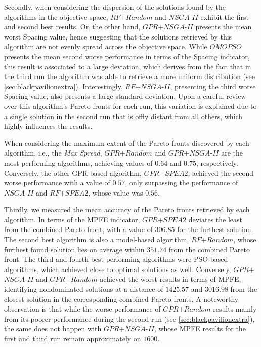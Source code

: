 Secondly, when considering the dispersion of the solutions found by the algorithms in the objective space, $RF$+$Random$ and $NSGA$-$II$ exhibit the first and second best results. On the other hand, $GPR$+$NSGA$-$II$ presents the mean worst Spacing value, hence suggesting that the solutions retrieved by this algorithm are not evenly spread across the objective space. While $OMOPSO$ presents the mean second worse performance in terms of the Spacing indicator, this result is associated to a large deviation, which derives from the fact that in the third run the algorithm was able to retrieve a more uniform distribution (see \cref{sec:blackpavilionextra}). Interestingly, $RF$+$NSGA$-$II$, presenting the third worse Spacing value, also presents a large standard deviation. Upon a careful review over this algorithm's Pareto fronts for each run, this variation is explained due to a single solution in the second run that is offly distant from all others, which highly influences the results. 

When considering the maximum extent of the Pareto fronts discovered by each algorithm, i.e., the \textit{Max Spread}, $GPR$+$Random$ and $GPR$+$NSGA$-$II$ are the most performing algorithms, achieving values of $0.64$ and $0.75$, respectively. Conversely, the other \ac{GPR}-based algorithm, $GPR$+$SPEA2$, achieved the second worse performance with a value of $0.57$, only surpassing the performance of $NSGA$-$II$ and $RF$+$SPEA2$, whose value was $0.56$. 

Thirdly, we measured the mean accuracy of the Pareto fronts retrieved by each algorithm. In terms of the \ac{MPFE} indicator, $GPR$+$SPEA2$ deviates the least from the combined Pareto front, with a value of $306.85$ for the furthest solution. The second best algorithm is also a model-based algorithm, $RF$+$Random$, whose furthest found solution lies on average within $351.74$ from the combined Pareto front. The third and fourth best performing algorithms were \ac{PSO}-based algorithms, which achieved close to optimal solutions as well. Conversely, $GPR$+$NSGA$-$II$ and $GPR$+$Random$ achieved the worst results in terms of \ac{MPFE}, identifying nondominated solutions at a distance of $1425.57$ and $3016.98$ from the closest solution in the corresponding combined Pareto fronts. A noteworthy observation is that while the worse performance of $GPR$+$Random$ results mainly from its poorer performance during the second run (see \cref{sec:blackpavilionextra}), the same does not happen with $GPR$+$NSGA$-$II$, whose \ac{MPFE} results for the first and third run remain approximately on $1600$. 

